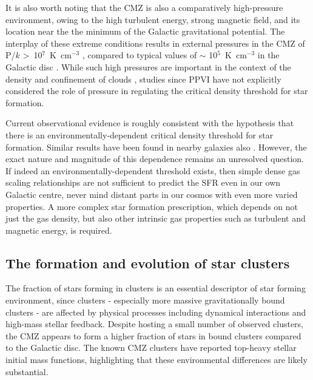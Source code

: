 It is also worth noting that the CMZ is also a comparatively high-pressure environment, owing to the high turbulent energy, strong magnetic field, and its location near the the minimum of the Galactic gravitational potential. The interplay of these extreme conditions results in external pressures in the CMZ of P/$k$ \textgreater \ 10$^{7}$~K~cm$^{-3}$ \citep[e.g. ][]{Rathborne2014a, Myers2022}, compared to typical values of $\sim$ 10$^{5}$~K~cm$^{-3}$ in the Galactic disc \citep[e.g.][]{Blitz1993, Schruba2019}. While such high pressures are important in the context of the density and confinement of clouds \citep[e.g.\ ][]{Longmore2014, Rathborne2014b, Walker2018}, studies since PPVI have not explicitly considered the role of pressure in regulating the critical density threshold for star formation.

Current observational evidence is roughly consistent with the hypothesis that there is an environmentally-dependent critical density threshold for star formation. Similar results have been found in nearby galaxies also \citep[e.g.][]{Usero2015, Bigiel2016, Querejeta2019, Jimenez-Donaire2019, Beslic2021, Eibensteiner2022}. However, the exact nature and magnitude of this dependence remains an unresolved question. If indeed an environmentally-dependent threshold exists, then simple dense gas scaling relationships are not sufficient to predict the SFR even in our own Galactic centre, never mind distant parts in our cosmos with even more varied properties. 
A more complex star formation prescription, which depends on not just the gas density, but also other intrinsic gas properties such as turbulent and magnetic energy, is required. 

\subsection{The formation and evolution of star clusters} 
\label{sec:starclusters}
The fraction of stars forming in clusters is an essential descriptor of star forming environment, since clusters - especially more massive gravitationally bound clusters - are affected by physical processes including dynamical interactions and high-mass stellar feedback.
Despite hosting a small number of observed clusters, the CMZ appears to form a higher fraction of stars in bound clusters compared to the Galactic disc.
The known CMZ clusters have reported top-heavy stellar initial mass functions, highlighting that these environmental differences are likely substantial.

